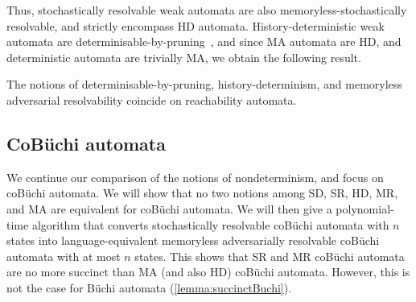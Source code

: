 Thus, stochastically resolvable weak automata are also memoryless-stochastically resolvable, and strictly encompass HD automata. 
History-deterministic weak automata are determinisable-by-pruning~\cite{BKS17}, and since MA automata are HD, and deterministic automata are trivially MA, we obtain the following result.
\begin{lemma}\label{lemma:reachability-hd=ma}
    The notions of determinisable-by-pruning, history-determinism, and memoryless adversarial resolvability coincide on reachability automata.
\end{lemma}

\subsection{CoB\"uchi automata}\label{subsec:sac-cobuchi}
We continue our comparison of the notions of nondeterminism, and focus on coB\"uchi automata. We will show that no two notions among SD, SR, HD, MR, and MA are equivalent for coB\"uchi automata. We will then give a polynomial-time algorithm that converts stochastically resolvable coB\"uchi automata with $n$ states into language-equivalent memoryless adversarially resolvable coB\"uchi automata with at most $n$ states. This shows that SR and MR coB\"uchi automata are no more succinct than MA (and also HD) coB\"uchi automata. 
However, this is not the case for B\"uchi automata (\cref{lemma:succinctBuchi}).

